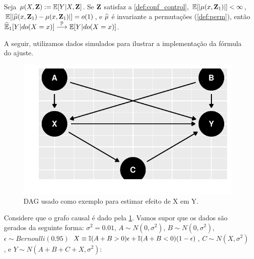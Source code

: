 \begin{theorem}
 \label{thm:conv_ajuste}
 Seja $\mu(X,{\mathbf{Z}}) := {\mathbb E}[Y|X,{\mathbf{Z}}]$.
 Se ${\mathbf{Z}}$ satisfaz a \cref{def:conf_control},
 ${\mathbb E}[|\mu(x,{\mathbf{Z}}_1)|] < \infty$,
 ${\mathbb E}[|{\widehat{\mu}}(x,{\mathbf{Z}}_1)-\mu(x,{\mathbf{Z}}_1)|] = o(1)$, 
 e ${\widehat{\mu}}$ é invariante a permutações (\cref{def:perm}), então
 ${\widehat{{\mathbb E}}}_{1}[Y|do(X=x)] \stackrel{{\mathbb P}}{\longrightarrow} {\mathbb E}[Y|do(X=x)]$.
\end{theorem}

A seguir, utilizamos dados simulados para
ilustrar a implementação da fórmula do ajuste.

\begin{example}
 \label{ex:backdoor_est_ajuste}
\begin{knitrout}
\color{fgcolor}\begin{figure}[t]

{\centering \includegraphics[width=\maxwidth]{./figures/backdoor_est_ex-1} 

}

\caption[DAG usado como exemplo para estimar efeito de X em Y]{DAG usado como exemplo para estimar efeito de X em Y.}\label{fig:backdoor_est_ex}
\end{figure}

\end{knitrout}

Considere que o grafo causal é
dado pela \cref{fig:backdoor_est_ex}.
Vamos supor que os dados são gerados da seguinte forma:
$\sigma^2 = 0.01$,
$A \sim N(0, \sigma^2)$, 
$B \sim N(0, \sigma^2)$,
$\epsilon \sim Bernoulli(0.95)$
$X \equiv {\mathbb I}(A + B > 0)\epsilon + {\mathbb I}(A + B < 0)(1-\epsilon)$,
$C \sim N(X, \sigma^2)$, e
$Y \sim N(A + B + C + X, \sigma^2)$:

\begin{knitrout}
\color{fgcolor}\begin{kframe}
\begin{alltt}
 \hlkwb{<-} \hlopt{::}\hlstd{(}\hlstd{)}


\end{alltt}
\end{kframe}
\end{knitrout}
\end{example}
